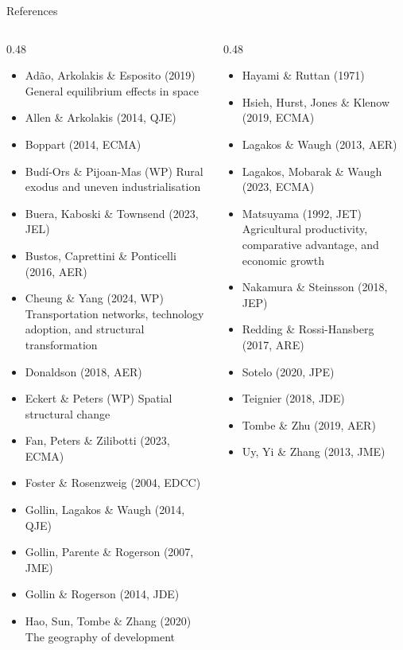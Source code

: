 \documentclass[10pt,aspectratio=169]{beamer}
\begin{document}
\begin{frame}{References}
  \begin{columns}[T]
    \begin{column}{0.48\textwidth}
    \scriptsize
    \begin{itemize}\setlength{\itemsep}{0pt}
      \item Adão, Arkolakis \& Esposito (2019) General equilibrium effects in space
      \item Allen \& Arkolakis (2014, QJE)
      \item Boppart (2014, ECMA)
      \item Budí-Ors \& Pijoan-Mas (WP) Rural exodus and uneven industrialisation
      \item Buera, Kaboski \& Townsend (2023, JEL)
      \item Bustos, Caprettini \& Ponticelli (2016, AER)
      \item Cheung \& Yang (2024, WP) Transportation networks, technology adoption, and
            structural transformation
      \item Donaldson (2018, AER)
      \item Eckert \& Peters (WP) Spatial structural change
      \item Fan, Peters \& Zilibotti (2023, ECMA)
      \item Foster \& Rosenzweig (2004, EDCC)
      \item Gollin, Lagakos \& Waugh (2014, QJE)
      \item Gollin, Parente \& Rogerson (2007, JME)
      \item Gollin \& Rogerson (2014, JDE)
      \item Hao, Sun, Tombe \& Zhang (2020) The geography of development
    \end{itemize}
    \end{column}
    \begin{column}{0.48\textwidth}
    \scriptsize
    \begin{itemize}\setlength{\itemsep}{0pt}
      \item Hayami \& Ruttan (1971)
      \item Hsieh, Hurst, Jones \& Klenow (2019, ECMA)
      \item Lagakos \& Waugh (2013, AER)
      \item Lagakos, Mobarak \& Waugh (2023, ECMA)
      \item Matsuyama (1992, JET) Agricultural productivity, comparative advantage, and
            economic growth
      \item Nakamura \& Steinsson (2018, JEP)
      \item Redding \& Rossi-Hansberg (2017, ARE)
      \item Sotelo (2020, JPE)
      \item Teignier (2018, JDE)
      \item Tombe \& Zhu (2019, AER)
      \item Uy, Yi \& Zhang (2013, JME)
    \end{itemize}
    \end{column}
  \end{columns}
\end{frame}
\end{document}
